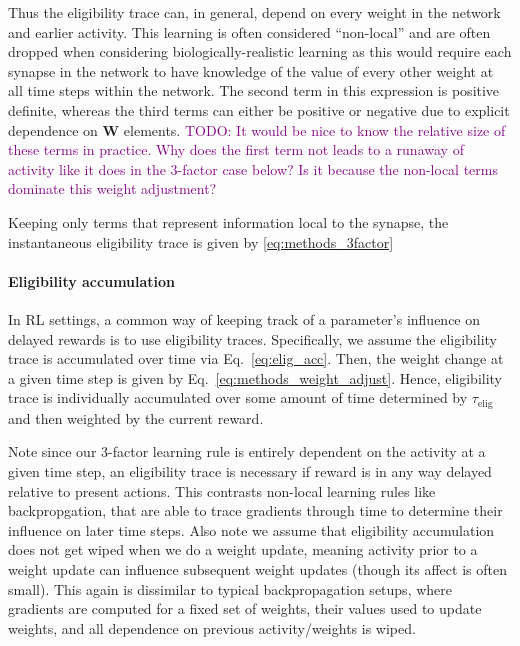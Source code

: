 \documentclass[
  journal=medium,
  manuscript=preprint,
  year=2026
]{aind-preprint}
\newcommand{\todo}[1]{\textcolor{purple}{TODO: #1}}
\begin{document}
Thus the eligibility trace can, in general, depend on every weight in the network and earlier activity. 
This learning is often considered ``non-local'' and are often dropped when considering biologically-realistic learning as this would require each synapse in the network to have knowledge of the value of every other weight at all time steps within the network.
The second term in this expression is positive definite, whereas the third terms can either be positive or negative due to explicit dependence on $\mathbf{W}$ elements.
\todo{It would be nice to know the relative size of these terms in practice. Why does the first term not leads to a runaway of activity like it does in the 3-factor case below? Is it because the non-local terms dominate this weight adjustment?}

Keeping only terms that represent information local to the synapse, the instantaneous eligibility trace is given by \eqref{eq:methods_3factor}

\paragraph{Eligibility accumulation}

In RL settings, a common way of keeping track of a parameter's influence on delayed rewards is to use eligibility traces.
Specifically, we assume the eligibility trace is accumulated over time via Eq.~\eqref{eq:elig_acc}.
Then, the weight change at a given time step is given by Eq.~\eqref{eq:methods_weight_adjust}.
Hence, eligibility trace is individually accumulated over some amount of time determined by $\tau_\text{elig}$ and then weighted by the current reward.

Note since our 3-factor learning rule is entirely dependent on the activity at a given time step, an eligibility trace is necessary if reward is in any way delayed relative to present actions. 
This contrasts non-local learning rules like backpropgation, that are able to trace gradients through time to determine their influence on later time steps. 
Also note we assume that eligibility accumulation does not get wiped when we do a weight update, meaning activity prior to a weight update can influence subsequent weight updates (though its affect is often small).
This again is dissimilar to typical backpropagation setups, where gradients are computed for a fixed set of weights, their values used to update weights, and all dependence on previous activity/weights is wiped. 
\end{document}
